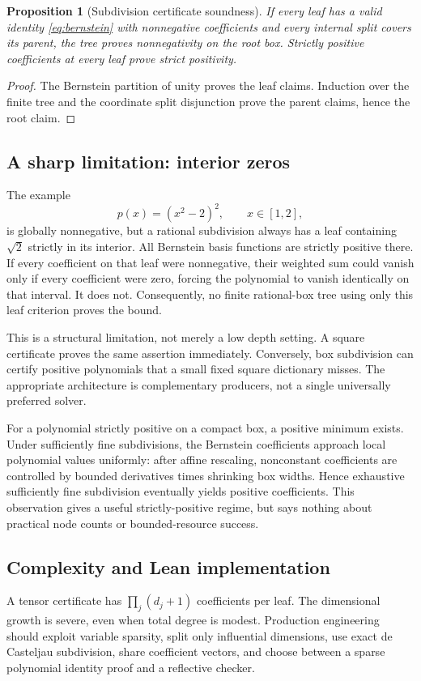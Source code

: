 \documentclass[11pt,a4paper]{article}
\newtheorem{proposition}{Proposition}[section]
\begin{document}
\begin{proposition}[Subdivision certificate soundness]
If every leaf has a valid identity \eqref{eq:bernstein} with nonnegative coefficients and every internal split covers its parent, the tree proves nonnegativity on the root box. Strictly positive coefficients at every leaf prove strict positivity.
\end{proposition}
\begin{proof}
The Bernstein partition of unity proves the leaf claims. Induction over the finite tree and the coordinate split disjunction prove the parent claims, hence the root claim.
\end{proof}

\subsection{A sharp limitation: interior zeros}
The example
\[
 p(x)=(x^2-2)^2,\qquad x\in[1,2],
\]
is globally nonnegative, but a rational subdivision always has a leaf containing $\sqrt2$ strictly in its interior. All Bernstein basis functions are strictly positive there. If every coefficient on that leaf were nonnegative, their weighted sum could vanish only if every coefficient were zero, forcing the polynomial to vanish identically on that interval. It does not. Consequently, no finite rational-box tree using only this leaf criterion proves the bound.

This is a structural limitation, not merely a low depth setting. A square certificate proves the same assertion immediately. Conversely, box subdivision can certify positive polynomials that a small fixed square dictionary misses. The appropriate architecture is complementary producers, not a single universally preferred solver.

For a polynomial strictly positive on a compact box, a positive minimum exists. Under sufficiently fine subdivisions, the Bernstein coefficients approach local polynomial values uniformly: after affine rescaling, nonconstant coefficients are controlled by bounded derivatives times shrinking box widths. Hence exhaustive sufficiently fine subdivision eventually yields positive coefficients. This observation gives a useful strictly-positive regime, but says nothing about practical node counts or bounded-resource success.

\subsection{Complexity and Lean implementation}
A tensor certificate has $\prod_j(d_j+1)$ coefficients per leaf. The dimensional growth is severe, even when total degree is modest. Production engineering should exploit variable sparsity, split only influential dimensions, use exact de Casteljau subdivision, share coefficient vectors, and choose between a sparse polynomial identity proof and a reflective checker.
\end{document}
